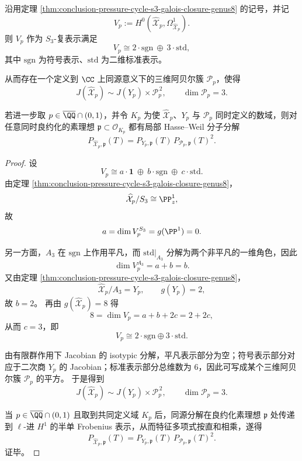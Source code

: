 \begin{theorem}\label{thm:conclusion-pressure-cycle-s3-hodge-jacobian}
沿用定理 \ref{thm:conclusion-pressure-cycle-s3-galois-closure-genus8} 的记号，并记
\[
V_p:=H^0(\widehat{\mathcal X}_p,\Omega_{\widehat{\mathcal X}_p}^1).
\]
则 \(V_p\) 作为 \(S_3\)-复表示满足
\[
V_p\cong 2\cdot \mathrm{sgn}\ \oplus\ 3\cdot \mathrm{std},
\]
其中 \(\mathrm{sgn}\) 为符号表示、\(\mathrm{std}\) 为二维标准表示。

从而存在一个定义到 \(\CC\) 上同源意义下的三维阿贝尔簇 \(\mathcal P_p\)，使得
\[
J(\widehat{\mathcal X}_p)\sim J(Y_p)\times \mathcal P_p^{\,2},
\qquad
\dim \mathcal P_p=3.
\]

若进一步取 \(p\in\overline{\QQ}\cap(0,1)\)，并令 \(K_p\) 为使 \(\widehat{\mathcal X}_p\)、\(Y_p\) 与 \(\mathcal P_p\) 同时定义的数域，则对任意同时良约化的素理想 \(\mathfrak p\subset\mathcal O_{K_p}\) 都有局部 Hasse--Weil 分子分解
\[
P_{\widehat{\mathcal X}_p,\mathfrak p}(T)
=
P_{Y_p,\mathfrak p}(T)\,P_{\mathcal P_p,\mathfrak p}(T)^2.
\]
\end{theorem}
\begin{proof}
设
\[
V_p\cong a\cdot \mathbf 1\ \oplus\ b\cdot \mathrm{sgn}\ \oplus\ c\cdot \mathrm{std}.
\]
由定理 \ref{thm:conclusion-pressure-cycle-s3-galois-closure-genus8}，
\[
\widehat{\mathcal X}_p/S_3\cong \PP^1_z,
\]
故
\[
a=\dim V_p^{S_3}=g(\PP^1)=0.
\]

另一方面，\(A_3\) 在 \(\mathrm{sgn}\) 上作用平凡，而 \(\mathrm{std}|_{A_3}\) 分解为两个非平凡的一维角色，因此
\[
\dim V_p^{A_3}=a+b=b.
\]
又由定理 \ref{thm:conclusion-pressure-cycle-s3-galois-closure-genus8}，
\[
\widehat{\mathcal X}_p/A_3=Y_p,
\qquad
g(Y_p)=2,
\]
故 \(b=2\)。
再由 \(g(\widehat{\mathcal X}_p)=8\) 得
\[
8=\dim V_p=a+b+2c=2+2c,
\]
从而 \(c=3\)，即
\[
V_p\cong 2\cdot \mathrm{sgn}\oplus 3\cdot \mathrm{std}.
\]

由有限群作用下 Jacobian 的 isotypic 分解，平凡表示部分为空；符号表示部分对应于二次商 \(Y_p\) 的 Jacobian；标准表示部分总维数为 \(6\)，因此可写成某个三维阿贝尔簇 \(\mathcal P_p\) 的平方。
于是得到
\[
J(\widehat{\mathcal X}_p)\sim J(Y_p)\times \mathcal P_p^{\,2},
\qquad
\dim \mathcal P_p=3.
\]

当 \(p\in\overline{\QQ}\cap(0,1)\) 且取到共同定义域 \(K_p\) 后，同源分解在良约化素理想 \(\mathfrak p\) 处传递到 \(\ell\)-进 \(H^1\) 的半单 Frobenius 表示，从而特征多项式按直和相乘，遂得
\[
P_{\widehat{\mathcal X}_p,\mathfrak p}(T)
=
P_{Y_p,\mathfrak p}(T)\,P_{\mathcal P_p,\mathfrak p}(T)^2.
\]
证毕。
\end{proof}

